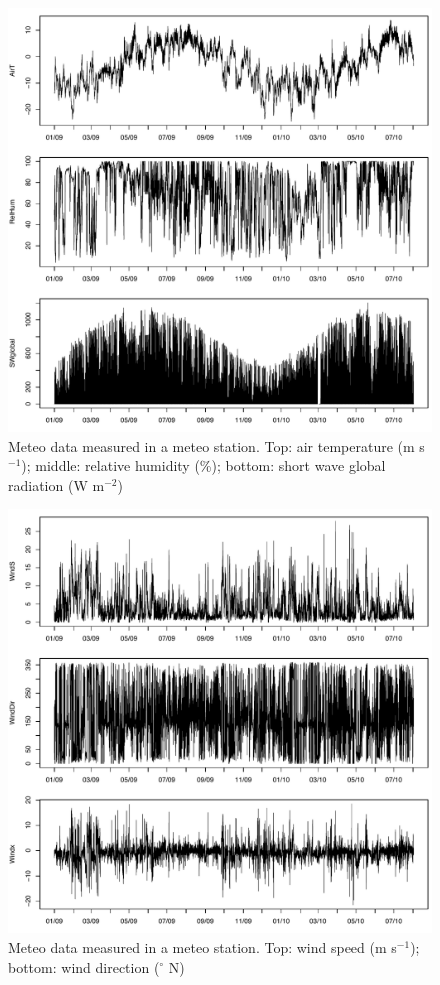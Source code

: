 \begin{figure}[t,b]
\centering
\includegraphics[width =0.9 \textwidth]{./images/pic_domain/meteo_cm1_old.pdf}
\caption{Meteo data measured in a meteo station. Top: air temperature (m s$^{-1}$); middle: relative humidity (\%); bottom: short wave global radiation (W m$^{-2}$)}
\label{meteo_cm1_old}
\end{figure}

\begin{figure}[t,b]
\centering
\includegraphics[width =0.9 \textwidth]{./images/pic_domain/meteo_cm2.pdf}
\caption{Meteo data measured in a meteo station. Top: wind speed (m s$^{-1}$); bottom: wind direction ($^\circ$ N)}
\label{meteo_cm2}
\end{figure}


